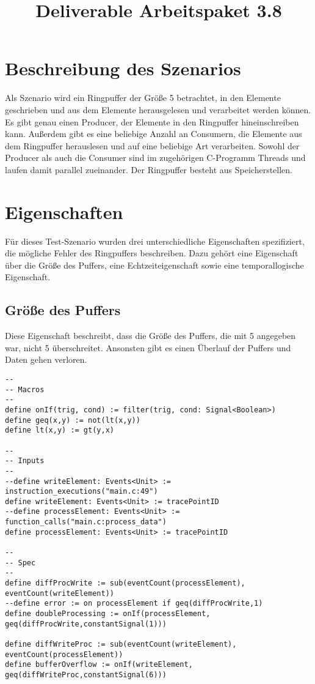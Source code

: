\documentclass{article}
\title{Deliverable Arbeitspaket 3.8}
\title{\thetitle}
\begin{document}
\maketitle

\section{Beschreibung des Szenarios}

Als Szenario wird ein Ringpuffer der Größe 5 betrachtet, in den Elemente geschrieben und aus dem Elemente herausgelesen und verarbeitet werden können. Es gibt genau einen Producer, der Elemente in den Ringpuffer hineinschreiben kann. Außerdem gibt es eine beliebige Anzahl an Consumern, die Elemente aus dem Ringpuffer herauslesen und auf eine beliebige Art verarbeiten. Sowohl der Producer als auch die Consumer sind im zugehörigen C-Programm Threads und laufen damit parallel zueinander. Der Ringpuffer besteht aus Speicherstellen.

\section{Eigenschaften}

Für dieses Test-Szenario wurden drei unterschiedliche Eigenschaften spezifiziert, die mögliche Fehler des Ringpuffers beschreiben. Dazu gehört eine Eigenschaft über die Größe des Puffers, eine Echtzeiteigenschaft sowie eine temporallogische Eigenschaft.

\subsection{Größe des Puffers}

Diese Eigenschaft beschreibt, dass die Größe des Puffers, die mit 5 angegeben war, nicht 5 überschreitet. Ansonsten gibt es einen Überlauf der Puffers und Daten gehen verloren.

\begin{lstlisting}[language=tessla+salt]
--
-- Macros
--
define onIf(trig, cond) := filter(trig, cond: Signal<Boolean>)
define geq(x,y) := not(lt(x,y))
define lt(x,y) := gt(y,x)

--
-- Inputs
--
--define writeElement: Events<Unit> := instruction_executions("main.c:49")
define writeElement: Events<Unit> := tracePointID
--define processElement: Events<Unit> := function_calls("main.c:process_data")
define processElement: Events<Unit> := tracePointID

--
-- Spec
--
define diffProcWrite := sub(eventCount(processElement), eventCount(writeElement))
--define error := on processElement if geq(diffProcWrite,1)
define doubleProcessing := onIf(processElement, geq(diffProcWrite,constantSignal(1)))

define diffWriteProc := sub(eventCount(writeElement), eventCount(processElement))
define bufferOverflow := onIf(writeElement, geq(diffWriteProc,constantSignal(6)))
\end{lstlisting}
\end{document}
